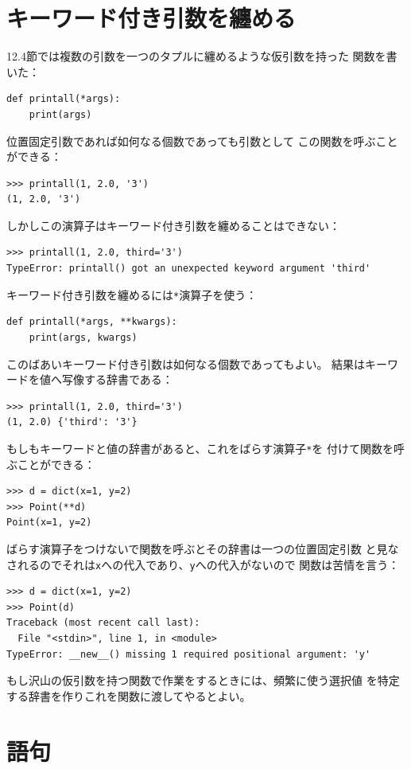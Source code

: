 \documentclass[a4j,12pt,makeidx]{jbook}
\begin{document}
\section{キーワード付き引数を纏める}
12.4節では複数の引数を一つのタプルに纏めるような仮引数を持った
関数を書いた：
\begin{verbatim}
def printall(*args):
    print(args)
\end{verbatim}
位置固定引数であれば如何なる個数であっても引数として
この関数を呼ぶことができる：
\begin{verbatim}
>>> printall(1, 2.0, '3')
(1, 2.0, '3')
\end{verbatim}
しかしこの{\tt *}演算子はキーワード付き引数を纏めることはできない：
\begin{verbatim}
>>> printall(1, 2.0, third='3')
TypeError: printall() got an unexpected keyword argument 'third'
\end{verbatim}
キーワード付き引数を纏めるには{\tt **}演算子を使う：
\begin{verbatim}
def printall(*args, **kwargs):
    print(args, kwargs)
\end{verbatim}
このばあいキーワード付き引数は如何なる個数であってもよい。
結果はキーワードを値へ写像する辞書である：
\begin{verbatim}
>>> printall(1, 2.0, third='3')
(1, 2.0) {'third': '3'}
\end{verbatim}
\indent
もしもキーワードと値の辞書があると、これをばらす演算子{\tt **}を
付けて関数を呼ぶことができる：
\begin{verbatim}
>>> d = dict(x=1, y=2)
>>> Point(**d)
Point(x=1, y=2)
\end{verbatim}
ばらす演算子をつけないで関数を呼ぶとその辞書は一つの位置固定引数
と見なされるのでそれは{\tt x}への代入であり、{\tt y}への代入がないので
関数は苦情を言う：
\begin{verbatim}
>>> d = dict(x=1, y=2)
>>> Point(d)
Traceback (most recent call last):
  File "<stdin>", line 1, in <module>
TypeError: __new__() missing 1 required positional argument: 'y'
\end{verbatim}
\indent
もし沢山の仮引数を持つ関数で作業をするときには、頻繁に使う選択値
を特定する辞書を作りこれを関数に渡してやるとよい。
%
\section{語句}
\end{document}
